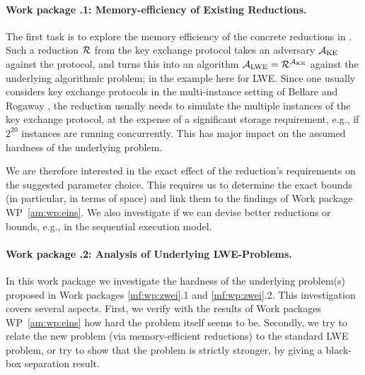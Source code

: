 \label{mf:wp:eins}

\paragraph{Work package \theworkpackage.1: Memory-efficiency of Existing Reductions.}

The first task is to explore the memory efficiency of the concrete reductions in \cite{P14,BCNS15,ADPS16,BCDMNNRS16}. Such a reduction $\mathcal{R}$ from the key exchange protocol takes an adversary $\mathcal{A}_\text{KE}$ against the protocol, and turns this into an algorithm $\mathcal{A}_\text{LWE}=\mathcal{R}^{\mathcal{A}_\text{KE}}$ against the underlying algorithmic problem; in the example here for LWE.
Since one usually considers key exchange protocols in the multi-instance setting of Bellare and Rogaway \cite{BR93}, the reduction usually needs to simulate the multiple instances of the key exchange protocol, at the expense of a significant storage requirement, e.g., if $2^{20}$ instances are running concurrently. This has major impact on the assumed hardness of the underlying problem.

We are therefore interested in the exact effect of the reduction's requirements on the suggested parameter choice. This requires us to determine the exact bounds (in particular, in terms of space) and link them to the findings of Work package WP~\ref{am:wp:eins}. 
We also investigate if we can devise better reductions or bounds, e.g., in the sequential execution model.


\paragraph{Work package \theworkpackage.2: Analysis of Underlying LWE-Problems.}

In this work package we investigate the hardness of the underlying problem(s) proposed in Work packages {\ref{mf:wp:zwei}}.1 and \ref{mf:wp:zwei}.2. This investigation covers several aspects. First, we verify with the results of Work packages WP~\ref{am:wp:eins} how hard the problem itself seems to be. Secondly, we try to relate the new problem (via memory-efficient reductions) to the standard LWE problem, or try to show that the problem is strictly stronger, by giving a black-box separation result.

